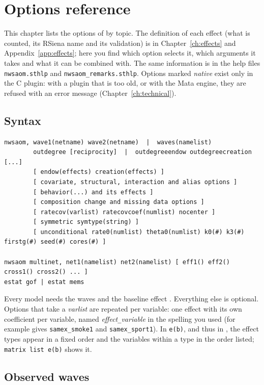 \chapter{Options reference}\label{ch:options}

This chapter lists the options of \nwsaom{} by topic. The definition of each effect (what is counted, its RSiena name and its validation) is in Chapter~\ref{ch:effects} and Appendix~\ref{app:effects}; here you find which option selects it, which arguments it takes and what it can be combined with. The same information is in the help files \texttt{nwsaom.sthlp} and \texttt{nwsaom\_remarks.sthlp}. Options marked \emph{native} exist only in the C plugin: with a plugin that is too old, or with the Mata engine, they are refused with an error message (Chapter~\ref{ch:technical}).

\section{Syntax}

\begin{lstlisting}
nwsaom, wave1(netname) wave2(netname)  |  waves(namelist)
        outdegree [reciprocity]  |  outdegreeendow outdegreecreation [...]
        [ endow(effects) creation(effects) ]
        [ covariate, structural, interaction and alias options ]
        [ behavior(...) and its effects ]
        [ composition change and missing data options ]
        [ ratecov(varlist) ratecovcoef(numlist) nocenter ]
        [ symmetric symtype(string) ]
        [ unconditional rate0(numlist) theta0(numlist) k0(#) k3(#) firstg(#) seed(#) cores(#) ]

nwsaom multinet, net1(namelist) net2(namelist) [ eff1() eff2() cross1() cross2() ... ]
estat gof | estat mems
\end{lstlisting}
Every model needs the waves and the baseline effect . Everything else is optional. Options that take a \emph{varlist} are repeated per variable: one effect with its own coefficient per variable, named \emph{effect}\texttt{\_}\emph{variable} in the spelling you used (for example  gives \texttt{samex\_smoke1} and \texttt{samex\_sport1}). In \texttt{e(b)}, and thus in , the effect types appear in a fixed order and the variables within a type in the order listed; \texttt{matrix list e(b)} shows it.

\section{Observed waves}

